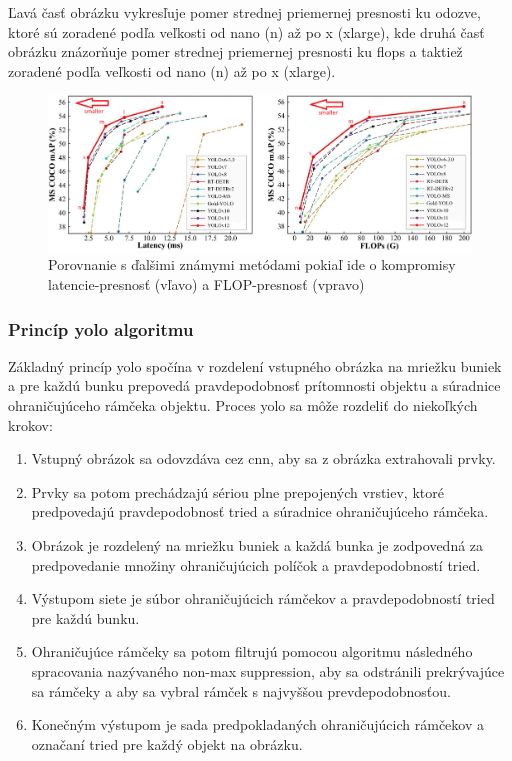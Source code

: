 Ľavá časť obrázku vykresľuje pomer strednej priemernej presnosti ku odozve, ktoré sú zoradené podľa veľkosti od nano (n) až po x (xlarge),
kde druhá časť obrázku znázorňuje pomer strednej priemernej presnosti ku \acrfull{flops} a taktiež zoradené podľa veľkosti od nano (n) až po x (xlarge).

\begin{figure}[H]
    \centering
    \includegraphics[width=1\linewidth]{figures/yolo.png}
    \caption{Porovnanie s ďalšimi známymi metódami pokiaľ ide o kompromisy latencie-presnosť (vľavo) a FLOP-presnosť (vpravo) \label{yolo}}
    \label{fig:enter-label}
\end{figure}

\subsubsection{Princíp \acrshort{yolo} algoritmu}

Základný princíp \acrshort{yolo} spočína v rozdelení vstupného obrázka na mriežku buniek a pre každú bunku prepovedá pravdepodobnosť prítomnosti objektu a súradnice ohraničujúceho rámčeka objektu.
Proces \acrshort{yolo} sa môže rozdeliť do niekoľkých krokov:

\begin{enumerate}

    \item Vstupný obrázok sa odovzdáva cez \acrshort{cnn}, aby sa z obrázka extrahovali prvky.
    \item Prvky sa potom prechádzajú sériou plne prepojených vrstiev, ktoré predpovedajú pravdepodobnosť tried a súradnice ohraničujúceho rámčeka.
    \item Obrázok je rozdelený na mriežku buniek a každá bunka je zodpovedná za predpovedanie množiny ohraničujúcich políčok a pravdepodobností tried.
    \item Výstupom siete je súbor ohraničujúcich rámčekov a pravdepodobností tried pre každú bunku.
    \item Ohraničujúce rámčeky sa potom filtrujú pomocou algoritmu následného spracovania nazývaného non-max suppression, aby sa odstránili prekrývajúce sa rámčeky a aby sa vybral rámček s najvyššou prevdepodobnosťou.
    \item Konečným výstupom je sada predpokladaných ohraničujúcich rámčekov a označaní tried pre každý objekt na obrázku. \cite{kili}

\end{enumerate}

